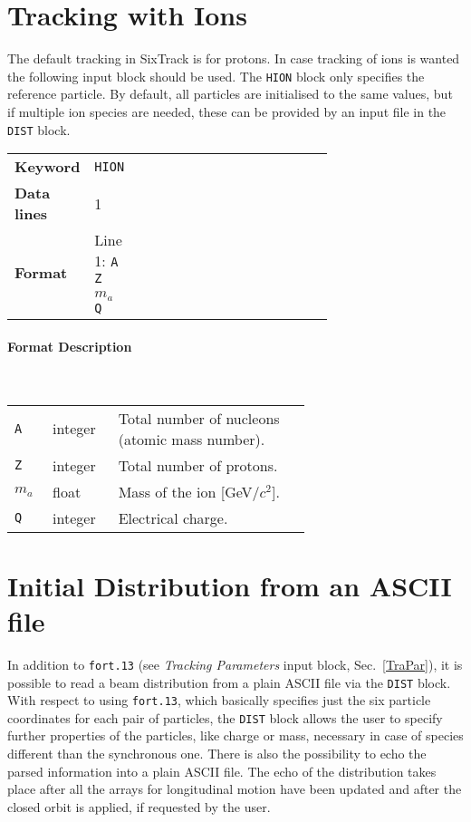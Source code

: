 \section{Tracking with Ions} \label{hions}

The default tracking in SixTrack is for protons.
In case tracking of ions is wanted the following input block should be used.
The \texttt{HION} block only specifies the reference particle.
By default, all particles are initialised to the same values, but if multiple ion species are needed, these can be provided by an input file in the \texttt{DIST} block.

\bigskip
\begin{tabular}{@{}llp{0.7\linewidth}}
    \textbf{Keyword}    & \texttt{HION}\index{HION} \\
    \textbf{Data lines} & 1 \\
    \textbf{Format}     & Line 1: \texttt{A Z $m_a$ Q}
\end{tabular}

\paragraph{Format Description}~

\bigskip
\begin{longtabu}{@{}llp{0.65\linewidth}}
    \texttt{A}     & integer & Total number of nucleons (atomic mass number). \\
    \texttt{Z}     & integer & Total number of protons. \\
    \texttt{$m_a$} & float   & Mass of the ion [GeV/$c^2$]. \\
    \texttt{Q}     & integer & Electrical charge.
\end{longtabu}

\section{Initial Distribution from an ASCII file} \label{distBlock}

In addition to \texttt{fort.13} (see \emph{Tracking Parameters} input block, Sec.~\ref{TraPar}), it is possible to read a beam distribution from a plain ASCII file via the \texttt{DIST} block.
With respect to using \texttt{fort.13}, which basically specifies just the six particle coordinates for each pair of particles, the \texttt{DIST} block allows the user to specify further properties of the particles, like charge or mass, necessary in case of species different than the synchronous one.
There is also the possibility to echo the parsed information into a plain ASCII file.
The echo of the distribution takes place after all the arrays for longitudinal motion have been updated and after the closed orbit is applied, if requested by the user.

